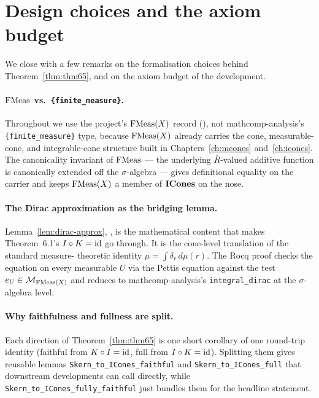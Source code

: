 \section{Design choices and the axiom budget}\label{sec:skern-design}

We close with a few remarks on the formalisation choices behind
Theorem~\ref{thm:thm65}, and on the axiom budget of the development.

\paragraph{\texorpdfstring{$\mathrm{FMeas}$}{FMeas} vs.\ \texttt{\{finite\_measure\}}.}
Throughout we use the project's $\mathrm{FMeas}(X)$ record
(), not mathcomp-analysis's
\texttt{\{finite\_measure\}} type, because $\mathrm{FMeas}(X)$ already
carries the cone, measurable-cone, and integrable-cone structure
built in Chapters~\ref{ch:mcones} and~\ref{ch:icones}. The
canonicality invariant of $\mathrm{FMeas}$ --- the underlying $\bar
R$-valued additive function is canonically extended off the
$\sigma$-algebra --- gives definitional equality on the carrier and
keeps $\mathrm{FMeas}(X)$ a member of $\mathbf{ICones}$ on the nose.

\paragraph{The Dirac approximation as the bridging lemma.}
Lemma~\ref{lem:dirac-approx},
, is the
mathematical content that makes Theorem~6.1's $I \circ K = \mathrm{id}$ go
through. It is the cone-level translation of the standard measure-
theoretic identity $\mu = \int \delta_r\,d\mu(r)$. The Rocq proof
checks the equation on every measurable $U$ via the Pettis equation
against the test $e_U \in \mathcal{M}_{\mathrm{FMeas}(X)}$ and reduces to
mathcomp-analysis's \texttt{integral\_dirac} at the
$\sigma$-algebra level.

\paragraph{Why faithfulness and fullness are split.}
Each direction of Theorem~\ref{thm:thm65} is one short corollary of
one round-trip identity (faithful from $K \circ I = \mathrm{id}$, full from
$I \circ K = \mathrm{id}$). Splitting them gives reusable lemmas
\texttt{Skern\_to\_ICones\_faithful} and
\texttt{Skern\_to\_ICones\_full} that downstream developments
can call directly, while \texttt{Skern\_to\_ICones\_fully\_faithful}
just bundles them for the headline statement.

